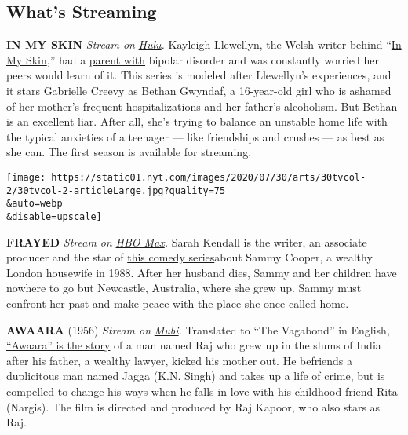 \hypertarget{whats-streaming}{%
\subsection{What's Streaming}\label{whats-streaming}}

\textbf{IN MY SKIN} \emph{Stream on}
\href{https://www.hulu.com/series/in-my-skin-91be18aa-30c6-40bf-b191-74503708b305}{\emph{Hulu}}\emph{.}
Kayleigh Llewellyn, the Welsh writer behind
``\href{https://www.nytimes.com/2020/06/01/arts/television/june-netflix.html}{In
My Skin},'' had a
\href{https://www.theguardian.com/tv-and-radio/2020/mar/29/kayleigh-llewellyn-in-my-skin-interview-bipolar-disorder-mum}{parent
with} bipolar disorder and was constantly worried her peers would learn
of it. This series is modeled after Llewellyn's experiences, and it
stars Gabrielle Creevy as Bethan Gwyndaf, a 16-year-old girl who is
ashamed of her mother's frequent hospitalizations and her father's
alcoholism. But Bethan is an excellent liar. After all, she's trying to
balance an unstable home life with the typical anxieties of a teenager
--- like friendships and crushes --- as best as she can. The first
season is available for streaming.

\texttt{[image: https://static01.nyt.com/images/2020/07/30/arts/30tvcol-2/30tvcol-2-articleLarge.jpg?quality=75\\\&auto=webp\\\&disable=upscale]}

\textbf{FRAYED} \emph{Stream on}
\href{https://www.hbomax.com/coming-soon/frayed}{\emph{HBO Max}}\emph{.}
Sarah Kendall is the writer, an associate producer and the star of
\href{https://tv.avclub.com/hbo-max-s-frayed-tells-several-coming-of-age-stories-b-1844460359}{this
comedy series}about Sammy Cooper, a wealthy London housewife in 1988.
After her husband dies, Sammy and her children have nowhere to go but
Newcastle, Australia, where she grew up. Sammy must confront her past
and make peace with the place she once called home.

\textbf{AWAARA} (1956) \emph{Stream on}
\href{https://mubi.com/films/the-vagabond-1951}{\emph{Mubi}}\emph{.}
Translated to ``The Vagabond'' in English,
\href{https://www.nytimes.com/1956/04/16/archives/screen-an-indian-import-the-vagabond-opens-at-cameo-theatre.html}{``Awaara''
is the story} of a man named Raj who grew up in the slums of India after
his father, a wealthy lawyer, kicked his mother out. He befriends a
duplicitous man named Jagga (K.N. Singh) and takes up a life of crime,
but is compelled to change his ways when he falls in love with his
childhood friend Rita (Nargis). The film is directed and produced by Raj
Kapoor, who also stars as Raj.


